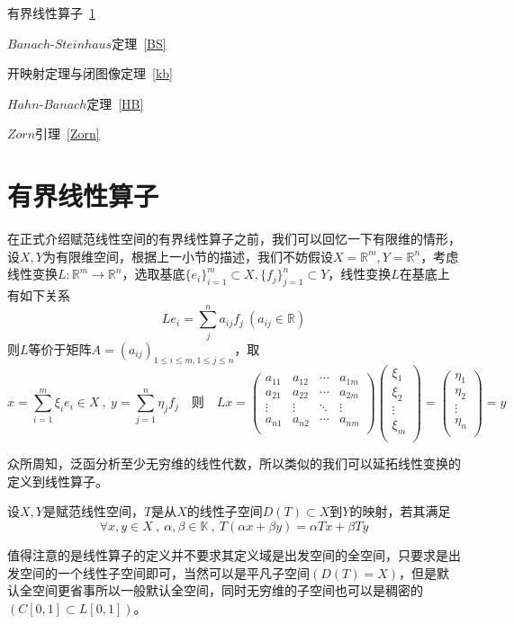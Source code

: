\begin{introduction}
    \item 有界线性算子~\ref{BX}
    \item $Banach$-$Steinhaus$定理~\ref{BS}
    \item 开映射定理与闭图像定理~\ref{kb}
    \item $Hahn$-$Banach$定理~\ref{HB}
    \item $Zorn$引理~\ref{Zorn}
\end{introduction}
\section{有界线性算子}\label{BX}
在正式介绍赋范线性空间的有界线性算子之前，我们可以回忆一下有限维的情形，设$X,Y$为有限维空间，根据上一小节的描述，我们不妨假设$X=\mathbb{R}^m,Y=\mathbb{R}^n$，考虑线性变换$L:\mathbb{R}^m \to \mathbb{R}^n$，选取基底$\{e_i\}_{i=1}^m \subset X , \{f_j\}_{j=1}^n \subset Y$，线性变换$L$在基底上有如下关系
\[Le_i=\sum_j^na_{ij}f_j \ (a_{ij} \in \mathbb{R})\]
则$L$等价于矩阵$A=(a_{ij})_{1 \leq i \leq m , 1 \leq j \leq n}$，取
\[x=\sum_{i=1}^m\xi_ie_i \in X \ , \ y=\sum_{j=1}^n\eta_jf_j \quad \text{则} \quad Lx=
\begin{pmatrix}
    a_{11} & a_{12} & \cdots & a_{1m} \\
    a_{21} & a_{22} & \cdots & a_{2m} \\
    \vdots & \vdots & \ddots & \vdots \\
    a_{n1} & a_{n2} & \cdots & a_{nm} \\
\end{pmatrix}
\begin{pmatrix}
    \xi_1 \\ \xi_2 \\ \vdots \\ \xi_m \\
\end{pmatrix}
=\begin{pmatrix}
    \eta_1 \\ \eta_2 \\ \vdots \\ \eta_n \\
\end{pmatrix}
=y
\]

众所周知，泛函分析至少无穷维的线性代数，所以类似的我们可以延拓线性变换的定义到线性算子。
\begin{definition}[线性算子]
    设$X,Y$是赋范线性空间，$T$是从$X$的线性子空间$D(T) \subset X$到$Y$的映射，若其满足
    \[\forall x,y \in X \ , \ \alpha,\beta \in \mathbb{K} \ , \ T(\alpha x+\beta y)=\alpha Tx+\beta Ty\]
\end{definition}
值得注意的是线性算子的定义并不要求其定义域是出发空间的全空间，只要求是出发空间的一个线性子空间即可，当然可以是平凡子空间$(D(T)=X)$，但是默认全空间更省事所以一般默认全空间，同时无穷维的子空间也可以是稠密的$(C[0,1] \subset L[0,1])$。

